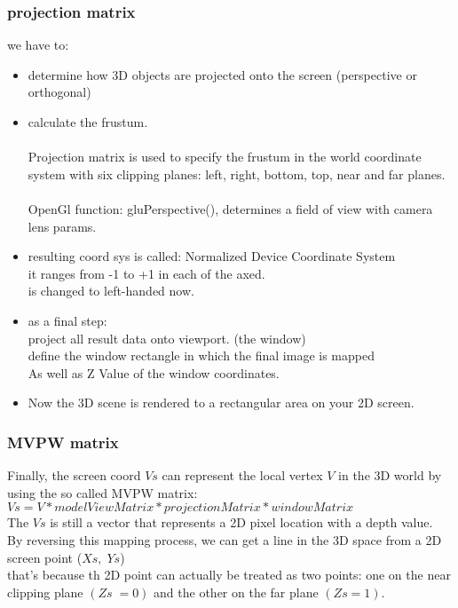 \documentclass[a4paper,12pt]{book}
\begin{document}
\subsubsection{projection matrix}
we have to:
\begin{itemize}
\item determine how 3D objects are projected onto the screen (perspective or orthogonal)
\item calculate the frustum.\\
\\
\textrightarrow Projection matrix is used to specify the frustum in the world coordinate system with six clipping planes: left, right, bottom, top, near and far planes.\\
\\
\textrightarrow OpenGl function: gluPerspective(), determines a field of view with camera lens params.
\item resulting coord sys is called: Normalized Device Coordinate System\\
\textrightarrow it ranges from -1 to +1 in each of the axed.\\
\textrightarrow is changed to left-handed now.
\item as a final step:\\
project all result data onto viewport. (the window)\\
define the window rectangle in which the final image is mapped\\
As well as Z Value of the window coordinates.
\item Now the 3D scene is rendered to a rectangular area on your 2D screen. 

\end{itemize}
\subsubsection{MVPW matrix}

Finally, the screen coord $Vs$ can represent the local vertex $V$ in the 3D world by using the so called MVPW matrix:\\

$Vs = V * modelViewMatrix * projectionMatrix * windowMatrix$\\

The $Vs$ is still a vector that represents a 2D pixel location with a depth value.\\
By reversing this mapping process, we can get a line in the 3D space from a 2D screen point ($Xs, \; Ys$)\\
\textrightarrow that's because th 2D point can actually be treated as two points: one on the near clipping plane $(Zs \; =0)$ and the other on the far plane $(Zs=1)$.\\
\end{document}
